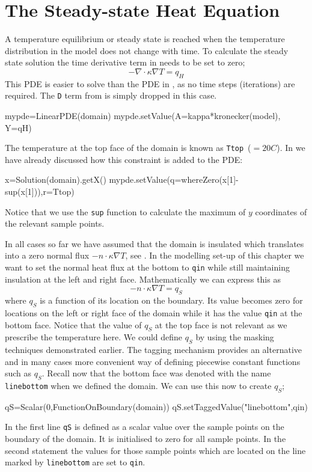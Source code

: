 \section{The Steady-state Heat Equation}
A temperature equilibrium or steady state is reached when the temperature
distribution in the model does not change with time. To calculate the steady
state solution the time derivative term in  needs to be
set to zero;
\begin{equation}\label{eqn:Tform nabla steady}
-\nabla \cdot \kappa \nabla T = q_H
\end{equation}
This PDE is easier to solve than the PDE in , as no time
steps (iterations) are required. The \verb|D| term from  is
simply dropped in this case.
\begin{python}
mypde=LinearPDE(domain)
mypde.setValue(A=kappa*kronecker(model), Y=qH)
\end{python}
The temperature at the top face of the domain is known as \verb|Ttop|~($=20 C$).
In  we have already discussed how this constraint is added
to the PDE:
\begin{python}
x=Solution(domain).getX()
mypde.setValue(q=whereZero(x[1]-sup(x[1])),r=Ttop)
\end{python}
Notice that we use the \verb|sup| function to calculate the maximum of $y$
coordinates of the relevant sample points.

In all cases so far we have assumed that the domain is insulated which
translates into a zero normal flux $-n \cdot \kappa \nabla T$, see
. In the modelling set-up of this chapter we want to set
the normal heat flux at the bottom to \verb|qin| while still maintaining
insulation at the left and right face. Mathematically we can express this as
\begin{equation}
-n \cdot \kappa \nabla T = q_{S}
\label{eq:inhom flux}
\end{equation}
where $q_{S}$ is a function of its location on the boundary. Its value
becomes zero for locations on the left or right face of the domain while it has
the value \verb|qin| at the bottom face.
Notice that the value of $q_{S}$ at the top face is not relevant as we
prescribe the temperature here.
We could define $q_{S}$ by using the masking techniques demonstrated
earlier. The tagging mechanism provides an alternative and in many cases more
convenient way of defining piecewise constant functions such as
$q_{S}$. Recall now that the bottom face was denoted with the name
\verb|linebottom| when we defined the domain.
We can use this now to create $q_{S}$;
\begin{python}
qS=Scalar(0,FunctionOnBoundary(domain))
qS.setTaggedValue("linebottom",qin)
\end{python}
In the first line \verb|qS| is defined as a scalar value over the sample points
on the boundary of the domain. It is initialised to zero for all sample points.
In the second statement the values for those sample points which are located on
the line marked by \verb|linebottom| are set to \verb|qin|. 

